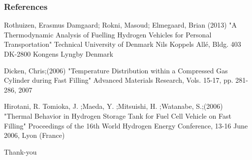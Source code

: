 \documentclass[10pt]{beamer}
\begin{document}
\begin{frame}
\frametitle{References}
\footnotesize{
\begin{thebibliography}{99} %
 Rothuizen, Erasmus Damgaard; Rokni, Masoud; Elmegaard, Brian (2013)
\newblock "A Thermodynamic Analysis of Fuelling Hydrogen Vehicles for Personal Transportation" Technical University of Denmark
\newblock Nils Koppels Allé, Bldg. 403 DK-2800 Kongens Lyngby Denmark


 Dicken, Chris;(2006)
\newblock "Temperature Distribution within a Compressed Gas Cylinder during Fast Filling"
\newblock  Advanced Materials Research, Vols. 15-17, pp. 281-286, 2007 


 Hirotani, R.
Tomioka, J. ;Maeda, Y. ;Mitsuishi, H. ;Watanabe, S.;(2006)
\newblock "Thermal Behavior in Hydrogen Storage Tank for Fuel Cell Vehicle on Fast Filling"
\newblock  Proceedings of the 16th World Hydrogen Energy Conference, 13-16 June 2006, Lyon (France)

\end{thebibliography}
}
\end{frame}


\begin{frame}

\large\centerline{Thank-you}

\small
\end{frame}

\end{document}
